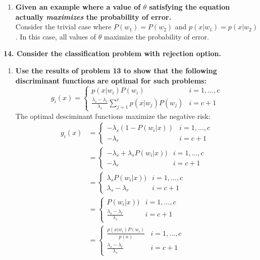 \documentclass[12pt]{article}
\begin{document}
\begin{enumerate}
\begin{enumerate}
  \item \textbf{Given an example where a value of $\theta$ satisfying the equation actually \emph{maximizes} the probability of error.} \\
    Consider the trivial case where $P(w_1)=P(w_2)$ and $p(x|w_1)=p(x|w_2)$. In this case, all values of $\theta$ maximize the probability of error.
  \end{enumerate}
  \subitem \textbf{14. Consider the classification problem with rejection option.}
  \begin{enumerate}
  \item \textbf{Use the results of problem 13 to show that the following discriminant functions are optimal for such problems:}
    \begin{equation}
      g_i(x) = \left\{ \begin{array}{ll}p(x|w_i)P(w_i) & i = 1, ..., c \\ \frac{\lambda_s-\lambda_r}{\lambda_s}\sum_{j=1}^c p(x|w_j)P(w_j) & i = c+1 \end{array} \right.
    \end{equation}
The optimal desciminant functions maximize the negative risk:
    \begin{equation}
    \begin{split}
      g_i(x)& = \left\{ \begin{array}{ll}-\lambda_s (1-P(w_i|x)) & i = 1, ..., c \\ -\lambda_r & i = c+1 \end{array} \right. \\
      & = \left\{ \begin{array}{ll}-\lambda_s + \lambda_s P(w_i|x)) & i = 1, ..., c \\ -\lambda_r & i = c+1 \end{array} \right. \\
      & = \left\{ \begin{array}{ll}\lambda_s P(w_i|x)) & i = 1, ..., c \\ \lambda_s -\lambda_r & i = c+1 \end{array} \right. \\
      & = \left\{ \begin{array}{ll}P(w_i|x)) & i = 1, ..., c \\ \frac{\lambda_s -\lambda_r}{\lambda_s} & i = c+1 \end{array} \right. \\
      & = \left\{ \begin{array}{ll}\frac{p(x|w_i)P(w_i)}{p(x)} & i = 1, ..., c \\ \frac{\lambda_s -\lambda_r}{\lambda_s} & i = c+1 \end{array} \right. \\

\end{split}
\end{equation}
\end{enumerate}
\end{enumerate}
\end{document}
